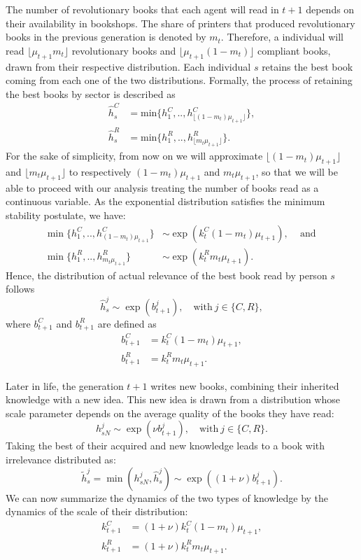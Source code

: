 The number of revolutionary books that each agent will read in $t+1$ depends on their availability in bookshops. The share of printers that produced revolutionary books in the previous generation is denoted by  $m_{t}$. Therefore, a individual will read $\lfloor \mu_{t+1} m_{t} \rfloor$ revolutionary books  and $\lfloor \mu_{t+1} (1-m_{t}) \rfloor$ compliant books, drawn from their respective distribution. Each individual $s$ retains the best book coming from each one of the two distributions.
 Formally, the process of retaining the best books by sector is described as
\begin{align*}	
   \hat{h}^C_s&=\text{min}\{h^C_1,..,h^C_{\lfloor(1-m_{t}) \mu_{t+1}\rfloor}\},
 \\ \hat{h}^R_s&=\text{min}\{h^R_1,..,h^R_{\lfloor m_{t} \mu_{t+1} \rfloor}\}.
 \end{align*}
 For the sake of simplicity, from now on we will approximate $\lfloor(1-m_{t}) \mu_{t+1}\rfloor$ and $\lfloor m_{t} \mu_{t+1} \rfloor$ to respectively  $(1-m_{t})\mu_{t+1}$ and $m_{t} \mu_{t+1} $, so that we will be able to proceed with our analysis treating the number of books read as a continuous variable.
As the exponential distribution satisfies the minimum stability postulate, we have:
\begin{align*}
\min\{h^C_1,..,h^C_{(1-m_{t}) \mu_{t+1}}\}& \sim \exp(k^C_{t} (1-m_{t}) \mu_{t+1}),\;\;\;\mbox{ and }\\
\min\{h^R_1,..,h^R_{ m_{t} \mu_{t+1} }\}& \sim \exp(k^R_{t} m_{t} \mu_{t+1}).
 \end{align*}
Hence, the distribution of actual relevance of the best book read by person $s$ follows
\begin{equation}
 \hat{h}^j_s \sim \exp(b_{t+1}^j), \quad \text{with} \ j\in \{C,R\},
\end{equation}
where $b_{t+1}^C$ and $b_{t+1}^R$ are defined as
 \begin{align*}
  b_{t+1}^C&=k_{t}^C (1-m_{t}) \mu_{t+1}, \\
  b_{t+1}^R&=k_{t}^R m_{t}  \mu_{t+1}.
 \end{align*}

Later in life, the generation $t+1$ writes new books,  combining their inherited knowledge with a new idea. This new idea is drawn from a distribution whose scale parameter depends on the average quality of the books they have read:
$$
h^j_{sN}\sim  \exp(\nu b^j_{t+1}), \quad \text{with} \ j\in \{C,R\}.
$$
Taking the best of their acquired and new knowledge leads to a book with irrelevance distributed as:
\begin{equation}
\tilde h^j_s=\min(h^j_{sN},\hat h^j_s) \sim  \exp((1+\nu) b^j_{t+1}). \label{eq:writing}
\end{equation}
We can now summarize the dynamics of the two types of knowledge by the dynamics of the scale of their distribution:
 \begin{align}
  k_{t+1}^C&=(1+\nu) k_{t}^C (1-m_{t}) \mu_{t+1},\label{eq:kCtime} \\
  k_{t+1}^R&=(1+\nu) k_{t}^R m_{t} \mu_{t+1}. \label{eq:kRtime}
 \end{align}


